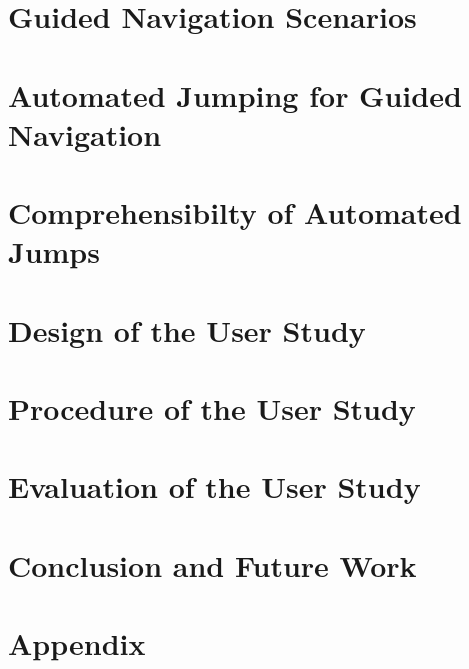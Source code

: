 
\chapter{Guided Navigation Scenarios}
%


\chapter{Automated Jumping for Guided Navigation}
%


\chapter{Comprehensibilty of Automated Jumps}
%


\chapter{Design of the User Study}
%


\chapter{Procedure of the User Study}
%


\chapter{Evaluation of the User Study}
%


\chapter{Conclusion and Future Work}






{\footnotesize
{}

}


\appendix
\chapter{Appendix}



